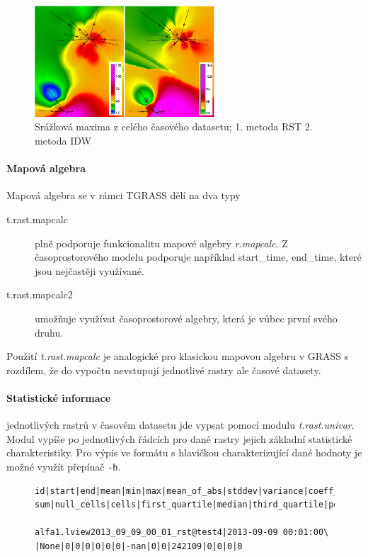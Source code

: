 \documentclass[a4paper,12pt,oneside]{report}
\begin{document}
\begin{figure}[h!]
    \centering
    \includegraphics[width=0.6\textwidth]{./img/analys/maxserie.png}
    \caption[Serie max]{Srážková maxima z celého časového datasetu; 1. metoda RST 2. metoda IDW  \centering  }
        \label{fig:baseline}
 \end{figure}



\paragraph*{Mapová algebra}
Mapová algebra se v rámci TGRASS dělí na dva typy
\begin{description}
\item [t.rast.mapcalc] plně podporuje funkcionalitu mapové algebry \textit{r.mapcalc}. Z časoprostorového modelu podporuje například start\_time, end\_time, které jsou nejčastěji využívané.
\item [t.rast.mapcalc2] umožňuje využívat časoprostorové algebry, která je vůbec první svého druhu.
\end{description}

Použití \textit{t.rast.mapcalc} je analogické pro klasickou mapovou algebru v GRASS s rozdílem, že do vypočtu nevstupují jednotlivé rastry ale časové datasety.



\paragraph{Statistické informace } jednotlivých rastrů v časovém datasetu jde vypsat pomocí modulu \textit{t.rast.univar}. Modul  vypíše po jednotlivých řádcích pro dané rastry jejich základní statistické charakteristiky. Pro výpis ve formátu s hlavičkou charakterizující dané hodnoty je možné využít přepínač \texttt{-h}.

\begin{figure}[h!]
\begin{footnotesize}
\lstset{extendedchars=false,
escapeinside=''}
\begin{lstlisting}[style=mybash]
id|start|end|mean|min|max|mean_of_abs|stddev|variance|coeff_var|\
sum|null_cells|cells|first_quartile|median|third_quartile|percentil

alfa1.lview2013_09_09_00_01_rst@test4|2013-09-09 00:01:00\
|None|0|0|0|0|0|0|-nan|0|0|242109|0|0|0|0
    
\end{lstlisting}
\end{footnotesize} 
\end{figure}
\end{document}
